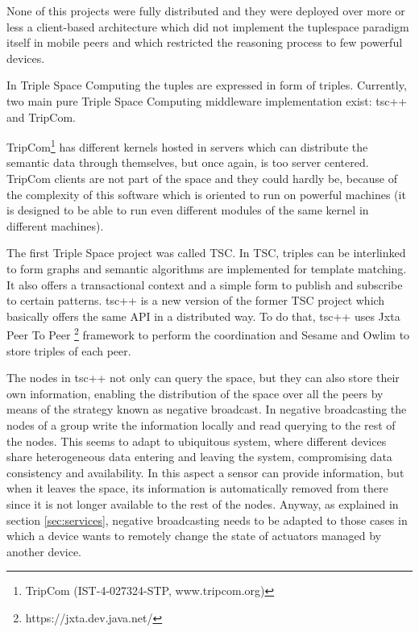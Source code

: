 None of this projects were fully distributed and they were deployed over more or less a client-based architecture which did not implement
the tuplespace paradigm itself in mobile peers and which restricted the reasoning process to few powerful devices.

In Triple Space Computing the tuples are expressed in form of triples. Currently, two main pure Triple Space Computing
middleware implementation exist: tsc++ and TripCom.

TripCom\footnote{TripCom (IST-4-027324-STP, www.tripcom.org)} has different kernels hosted in servers which can distribute the semantic data
through themselves, but once again, is too server centered. TripCom clients are not part of the space and they could hardly be, because of
the complexity of this software which is oriented to run on powerful machines (it is designed to be able to run even different modules of the
same kernel in different machines).

The first Triple Space project was called TSC. In TSC, triples can be interlinked to form graphs and semantic
algorithms are implemented for template matching. It also offers a transactional context and a simple form to publish and subscribe to certain patterns.
tsc++ \cite{krummenacher_open_2009} is a new version of the former TSC project\cite{fensel_triple-space_2004} which basically offers
the same API in a distributed way. To do that, tsc++ uses Jxta Peer To Peer \footnote{https://jxta.dev.java.net/} framework to perform the
coordination and Sesame \cite{broekstra_sesame:_2002} and Owlim \cite{kiryakov_owlimpragmatic_2005} to store triples of each peer.

The nodes in tsc++ not only can query the space, but they can also store their own information, enabling the distribution
of the space over all the peers by means of the strategy known as negative broadcast. In negative broadcasting the nodes
of a group write the information locally and read querying to the rest of the nodes. This seems to adapt to
ubiquitous system, where different devices share heterogeneous data entering and leaving the system, compromising data consistency
and availability. In this aspect a sensor can provide information, but when it leaves the space, its information is automatically
removed from there since it is not longer available to the rest of the nodes. Anyway, as explained in section \ref{sec:services},
negative broadcasting needs to be adapted to those cases in which a device wants to remotely change the state of actuators managed
by another device.

